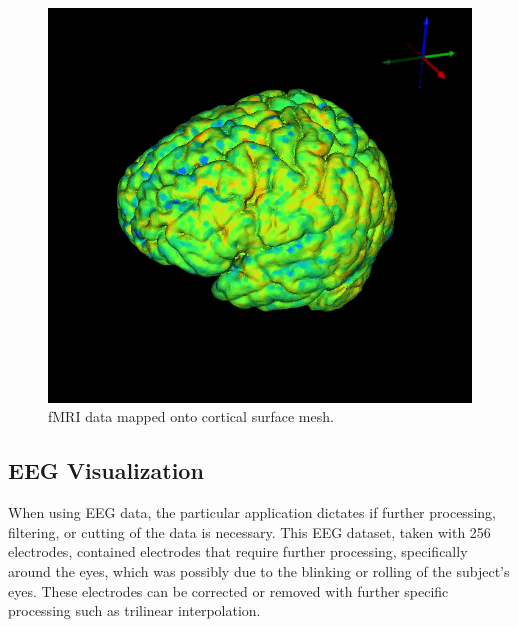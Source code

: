 \begin{figure}[H]
\begin{center}
\includegraphics[width=.75\textwidth]{Figures/fmri_1}
\caption{fMRI data mapped onto cortical surface mesh.}
\label{fig:fmrivis}
\end{center}
\end{figure}

\subsection{EEG Visualization}

When using EEG data, the particular application dictates if further processing, filtering, or cutting of the data is necessary. This EEG dataset, taken with 256 electrodes, contained electrodes that require further processing, specifically around the eyes, which was possibly due to the blinking or rolling of the subject's eyes. These electrodes can be corrected or removed with further specific processing such as trilinear interpolation.

